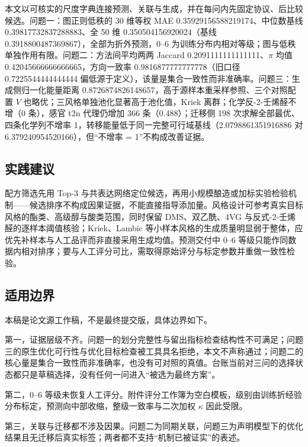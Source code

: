 \documentclass[11pt,a4paper]{article}
\begin{document}
本文以可核实的尺度字典连接预测、关联与生成，并在每问内先固定协议、后比较候选。问题一：图正则低秩的
30 维等权 MAE 0.35929156588219174、中位数基线 0.39817732837288883、全 50
维 0.350504156920024（基线 0.3918800487369867），全部为折外预测，0--6
为训练分布内相对等级；图与低秩单独作用有限。问题二：方法间平均两两
Jaccard 0.2091111111111111、\(\pi\) 均值 0.42045666666666665，方向一致率
0.9816877777777778（旧口径 0.7225544444444444
偏低源于定义），该量是集合一致性而非准确率。问题三：生成侧归一化能量距离
0.8726874826148657，高于源样本重采样参照、三个对照配置 \(V\)
也略优；三风格单独池化显著高于池化值，Kriek 离群；化学反-2-壬烯醛不增（0
条），感官 t2n 代理仍增加 366 条（0.488）；迁移侧 198
次求解全部最优、四条化学列不增率
1，转移能量低于同一完整可行域基线（2.0798861351916886 对
6.379240954520166），但``不增率 = 1''不构成改善证据。

\subsection{实践建议}\label{ux5b9eux8df5ux5efaux8bae}

配方筛选先用 Top-3
与共表达网络定位候选，再用小规模酿造或加标实验检验机制------候选排序不构成因果证据，不能直接指导添加量。风格设计可参考真实目标风格的酯类、高级醇与酸类范围，同时保留
DMS、双乙酰、4VG 与反式-2-壬烯醛的逐样本阈值核验；Kriek、Lambic
等小样本风格的生成质量明显弱于整体，应优先补样本与人工品评而非直接采用生成均值。预测交付中
0--6
等级只能作同数据内相对排序；要与人工评分可比，需取得原始评分与标定参数并重做一致性检验。

\subsection{适用边界}\label{ux9002ux7528ux8fb9ux754c}

本稿是论文源工作稿，不是最终提交版，具体边界如下。

第一，证据层级不齐。问题一的划分完整性与留出指标检查结构性不可满足；问题三的原生优化可行性与优化目标检查被工具具名拒绝，本文不声称通过；问题二的核心量是集合一致性而非准确率，也没有可对照的真值。台账当前对三问的选择状态都只是草稿选择，没有任何一问进入``被选为最终方案''。

第二，0--6
等级未恢复人工评分。附件评分工作簿为空白模板，级别由训练折经验分布标定，预测向中部收缩，整级一致率与二次加权
\(\kappa\) 因此受限。

第三，关联与迁移都不涉及因果。问题二为同期关联，问题三为声明模型下的优化结果且无迁移后真实标签；两者都不支持``机制已被证实''的表述。
\end{document}
